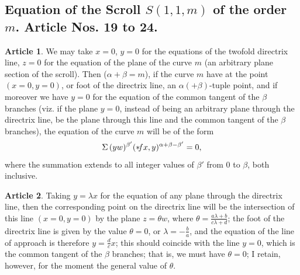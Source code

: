 \documentclass[12pt,a4paper]{article}
\theoremstyle{definition}
\newtheorem{art}{Article}[section]
\begin{document}
\subsection*{Equation of the Scroll $S(1, 1, m)$ of the order $m$. Article Nos. 19 to 24.}

\begin{art}
We may take $x = 0$, $y = 0$ for the equations of the twofold directrix line, $z = 0$ for the equation of the plane of the curve $m$ (an arbitrary plane section of the scroll). Then ($\alpha + \beta = m$), if the curve $m$ have at the point $(x = 0, y = 0)$, or foot of the directrix line, an $\alpha (+ \beta)$-tuple point, and if moreover we have $y = 0$ for the equation of the common tangent of the $\beta$ branches (viz. if the plane $y = 0$, instead of being an arbitrary plane through the directrix line, be the plane through this line and the common tangent of the $\beta$ branches), the equation of the curve $m$ will be of the form
\[
\Sigma \, (yw)^{\beta'} (* \hspace{-2pt} fx, y)^{\alpha + \beta - \beta'} = 0,
\]
where the summation extends to all integer values of $\beta'$ from $0$ to $\beta$, both inclusive.
\end{art}

\begin{art}
Taking $y = \lambda x$ for the equation of any plane through the directrix line, then the corresponding point on the directrix line will be the intersection of this line $(x = 0, y = 0)$ by the plane $z = \theta w$, where $\theta = \frac{a\lambda + b}{c\lambda + d}$; the foot of the directrix line is given by the value $\theta = 0$, or $\lambda = -\frac{b}{a}$, and the equation of the line of approach is therefore $y = \frac{d}{c}x$; this should coincide with the line $y = 0$, which is the common tangent of the $\beta$ branches; that is, we must have $\theta = 0$; I retain, however, for the moment the general value of $\theta$.
\end{art}
\end{document}
